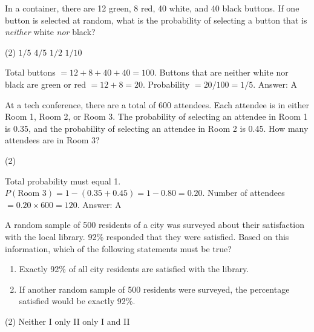 \documentclass[11pt,paper=a4,answers]{exam}
\begin{document}
\begin{questions}
\vspace{1cm}

\question
In a container, there are 12 green, 8 red, 40 white, and 40 black buttons. If one button is selected at random, what is the probability of selecting a button that is \textit{neither} white \textit{nor} black?
\begin{tasks}(2)
    \task $1/5$ \task $4/5$ \task $1/2$ \task $1/10$
\end{tasks}

\begin{solution}
Total buttons $= 12 + 8 + 40 + 40 = 100$.
\vspace{5pt}
Buttons that are neither white nor black are green or red $= 12 + 8 = 20$.
\vspace{5pt}
Probability $= 20/100 = 1/5$.
\vspace{5pt}
Answer: \colorbox{yellow!100}{A}
\end{solution}

\vspace{1cm}

\question
At a tech conference, there are a total of 600 attendees. Each attendee is in either Room 1, Room 2, or Room 3. The probability of selecting an attendee in Room 1 is 0.35, and the probability of selecting an attendee in Room 2 is 0.45. How many attendees are in Room 3?
\begin{tasks}(2)
       
\end{tasks}

\begin{solution}
Total probability must equal 1. 
\vspace{5pt}
$P(\text{Room 3}) = 1 - (0.35 + 0.45) = 1 - 0.80 = 0.20$.
\vspace{5pt}
Number of attendees $= 0.20 \times 600 = 120$.
\vspace{5pt}
Answer: \colorbox{yellow!100}{A}
\end{solution}

\vspace{1cm}

\question
A random sample of 500 residents of a city was surveyed about their satisfaction with the local library. 92\% responded that they were satisfied. Based on this information, which of the following statements must be true?
\begin{enumerate}
    \item Exactly 92\% of all city residents are satisfied with the library.
    \item If another random sample of 500 residents were surveyed, the percentage satisfied would be exactly 92\%.
\end{enumerate}
\begin{tasks}(2)
    \task Neither \task I only \task II only \task I and II
\end{tasks}


\end{questions}
\end{document}
